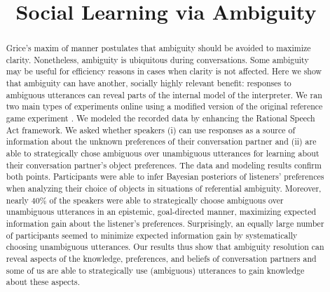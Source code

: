 \documentclass[10pt,a4paper]{article}
\title{Social Learning via Ambiguity}
\begin{document}
\maketitle

\begin{abstract}
Grice's maxim of manner postulates that ambiguity should be avoided to maximize clarity.
Nonetheless, ambiguity is ubiquitous during conversations.
Some ambiguity may be useful for efficiency reasons in cases when clarity is not affected.
Here we show that ambiguity can have another, socially highly relevant benefit:
responses to ambiguous utterances can reveal parts of the internal model of the interpreter.
We ran two main types of experiments online using a modified version of the original reference game experiment \cite{frankgoodman2012}. We modeled the recorded data by enhancing the Rational Speech Act framework.
We asked whether speakers (i) can use responses as a source of information about the unknown preferences of their conversation partner and (ii) are able to strategically chose ambiguous over unambiguous utterances for learning about their conversation partner's object preferences. 
The data and modeling results confirm both points. 
Participants were able to infer Bayesian posteriors of listeners' preferences when analyzing their choice of objects in situations of referential ambiguity.
Moreover, nearly 40\% of the speakers were able to strategically choose ambiguous over unambiguous utterances in an epistemic, goal-directed manner, maximizing expected information gain about the listener's preferences.
Surprisingly, an equally large number of participants seemed to minimize expected information gain by systematically choosing unambiguous utterances. 
Our results thus show that ambiguity resolution can reveal aspects of the knowledge, preferences, and beliefs of conversation partners and some of us are able to strategically use (ambiguous) utterances to gain knowledge about these aspects.

\end{abstract}
\end{document}
